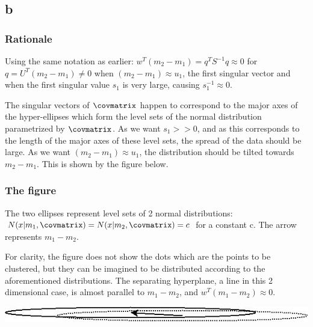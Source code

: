 \documentclass{article}
\begin{document}
\subsection{b}
\subsubsection{Rationale}
Using the same notation as earlier: $w^{T}(m_{2} - m_{1}) = q^{T}S^{-1}q \approx 0$ for $q = U^{T}(m_{2} - m_{1}) \neq 0$ when $(m_{2} - m_{1}) \approx u_{1}$, the first singular vector and when the first singular value $s_{1}$ is very large, causing $s_{1}^{-1} \approx 0$.

The singular vectors of $\covmatrix$ happen to correspond to the major axes of the hyper-ellipses which form the level sets of the normal distribution parametrized by $\covmatrix$. As we want $s_{1}>>0$, and as this corresponds to the length of the major axes of these level sets, the spread of the data should be large. As we want $(m_{2} - m_{1}) \approx u_{1}$, the distribution should be tilted towards $m_{2} - m_{1}$. This is shown by the figure below.

\subsubsection{The figure}
The two ellipses represent level sets of 2 normal distributions: $N(x|m_{1}, \covmatrix)= N(x|m_{2}, \covmatrix) = c$ for a constant c. The arrow represents $m_{1} - m_{2}$.

For clarity, the figure does not show the dots which are the points to be clustered, but they can be imagined to be distributed according to the aforementioned distributions. The separating hyperplane, a line in this 2 dimensional case, is almost parallel to $m_{1} - m_{2}$, and $w^{T}(m_{1} - m_{2}) \approx 0$.

\includegraphics[scale=.5]{images/example.jpg}


% 
% 
\end{document}
